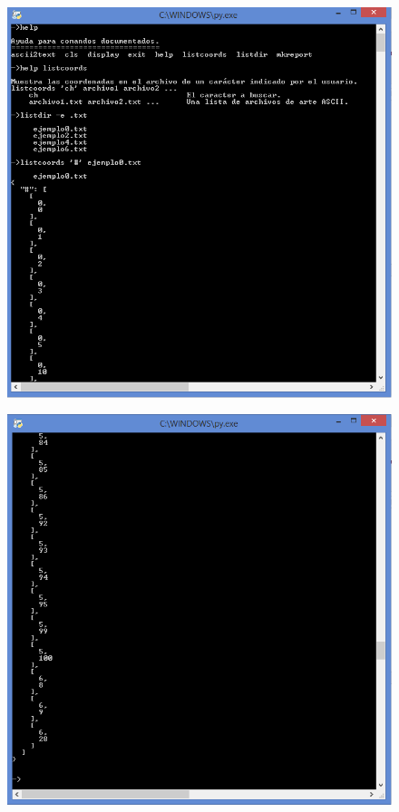 \documentclass[a4paper,12pt]{article}
\begin{document}
\begin{figure}[h!]
    \begin{adjustbox}{max width=\textwidth, center}
        \includegraphics{C4/S5_C4.PNG}
    \end{adjustbox}
\end{figure}
\begin{figure}[h!]
    \begin{adjustbox}{max width=\textwidth, center}
        \includegraphics{C4/S6_C4.PNG}
    \end{adjustbox}
\end{figure}
\end{document}
